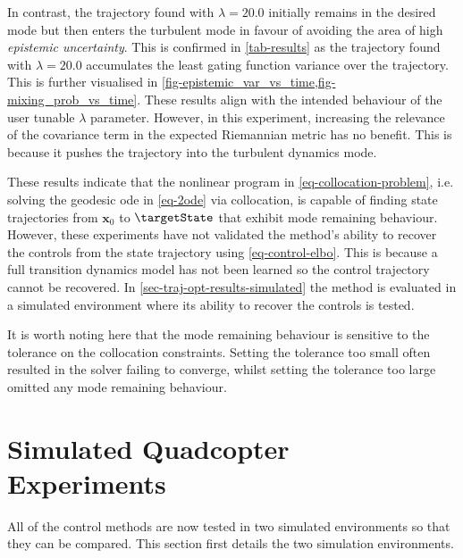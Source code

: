 \documentclass{mimosis-class/mimosis}
\numberwithin{equation}{chapter}
\newcommand{\state}{\ensuremath{\mathbf{x}}}
\begin{document}
{In contrast, the trajectory found with \(\lambda=20.0\) initially remains in the desired mode
but then enters the turbulent mode in favour of avoiding the area of high \emph{epistemic uncertainty}.
This is confirmed in \cref{tab-results} as the trajectory found with \(\lambda=20.0\) accumulates the least gating
function variance over the trajectory.
This is further visualised in \cref{fig-epistemic_var_vs_time,fig-mixing_prob_vs_time}.
These results align with the intended behaviour of the user tunable \(\lambda\) parameter.
However, in this experiment, increasing the relevance of the covariance term in the expected Riemannian
metric has no benefit.
This is because it pushes the trajectory into the turbulent dynamics mode.

These results indicate that the nonlinear program in \cref{eq-collocation-problem},
i.e. solving the geodesic \acrshort{ode} in \cref{eq-2ode} via collocation, is capable of finding state
trajectories from \(\state_0\) to \(\targetState\) that exhibit mode remaining behaviour.
However, these experiments have not validated the method's ability to recover the controls from the state trajectory
using \cref{eq-control-elbo}.
This is because a full transition dynamics model has not been learned so the control trajectory cannot be recovered.
In \cref{sec-traj-opt-results-simulated} the method is evaluated in a simulated environment
where its ability to recover the controls is tested.

It is worth noting here that the mode remaining behaviour is
sensitive to the tolerance on the collocation constraints.
Setting the tolerance too small often resulted in the solver failing to converge, whilst setting the tolerance too
large omitted any mode remaining behaviour.

\section{Simulated Quadcopter Experiments \label{sec-traj-opt-results-simulated}}
\label{sec:orgecc72f9}
All of the control methods are now tested in two simulated environments so that they can be compared.
This section first details the two simulation environments.

}
\end{document}
